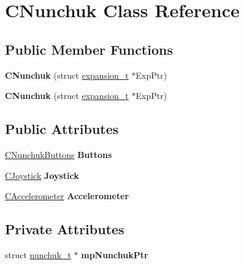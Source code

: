 \hypertarget{class_c_nunchuk}{\section{C\-Nunchuk Class Reference}
\label{class_c_nunchuk}
}
\subsection*{Public Member Functions}
\begin{DoxyCompactItemize}
\item 
\hypertarget{class_c_nunchuk_a6f4eaa8c718137b80c31bd845949eea4}{{\bfseries C\-Nunchuk} (struct \hyperlink{structexpansion__t}{expansion\-\_\-t} $\ast$Exp\-Ptr)}\label{class_c_nunchuk_a6f4eaa8c718137b80c31bd845949eea4}

\item 
\hypertarget{class_c_nunchuk_a6f4eaa8c718137b80c31bd845949eea4}{{\bfseries C\-Nunchuk} (struct \hyperlink{structexpansion__t}{expansion\-\_\-t} $\ast$Exp\-Ptr)}\label{class_c_nunchuk_a6f4eaa8c718137b80c31bd845949eea4}

\end{DoxyCompactItemize}
\subsection*{Public Attributes}
\begin{DoxyCompactItemize}
\item 
\hypertarget{class_c_nunchuk_a781de564cb6f35c885534c8f3878adf0}{\hyperlink{class_c_nunchuk_buttons}{C\-Nunchuk\-Buttons} {\bfseries Buttons}}\label{class_c_nunchuk_a781de564cb6f35c885534c8f3878adf0}

\item 
\hypertarget{class_c_nunchuk_a06c368af6b3dcef2b8b5619a4f02d5fb}{\hyperlink{class_c_joystick}{C\-Joystick} {\bfseries Joystick}}\label{class_c_nunchuk_a06c368af6b3dcef2b8b5619a4f02d5fb}

\item 
\hypertarget{class_c_nunchuk_a7644bb8821e484b421e49488bb10052d}{\hyperlink{class_c_accelerometer}{C\-Accelerometer} {\bfseries Accelerometer}}\label{class_c_nunchuk_a7644bb8821e484b421e49488bb10052d}

\end{DoxyCompactItemize}
\subsection*{Private Attributes}
\begin{DoxyCompactItemize}
\item 
\hypertarget{class_c_nunchuk_a9bc5fadad89c620f7f262583d22e2c5b}{struct \hyperlink{structnunchuk__t}{nunchuk\-\_\-t} $\ast$ {\bfseries mp\-Nunchuk\-Ptr}}\label{class_c_nunchuk_a9bc5fadad89c620f7f262583d22e2c5b}

\end{DoxyCompactItemize}


